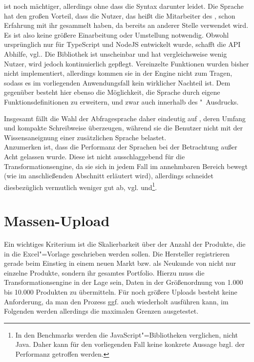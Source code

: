  ist noch mächtiger, allerdings ohne dass die Syntax darunter leidet. Die Sprache hat den großen Vorteil, dass die Nutzer, das heißt die Mitarbeiter des , schon Erfahrung mit ihr gesammelt haben, da  bereits an anderer Stelle verwendet wird. Es ist also keine größere Einarbeitung oder Umstellung notwendig. Obwohl  ursprünglich nur für TypeScript und NodeJS entwickelt wurde, schafft die API  Abhilfe, vgl.\nbs\cite{jsonata:java}. Die Bibliothek ist unscheinbar und hat vergleichsweise wenig Nutzer, wird jedoch kontinuierlich gepflegt. Vereinzelte Funktionen wurden bisher nicht implementiert, allerdings kommen sie in der Engine nicht zum Tragen, sodass es im vorliegenden Anwendungsfall kein wirklicher Nachteil ist. Dem gegenüber besteht hier ebenso die Möglichkeit, die Sprache durch eigene Funktionsdefinitionen zu erweitern, und zwar auch innerhalb des "~Ausdrucks.

Insgesamt fällt die Wahl der Abfragesprache daher eindeutig auf , deren Umfang und kompakte Schreibweise überzeugen, während sie die Benutzer nicht mit der Wissensaneignung einer zusätzlichen Sprache belastet.\\
Anzumerken ist, dass die Performanz der Sprachen bei der Betrachtung außer Acht gelassen wurde. Diese ist nicht ausschlaggebend für die Transformationsengine, da sie sich in jedem Fall im annehmbaren Bereich bewegt (wie im anschließenden Abschnitt erläutert wird), allerdings schneidet diesbezüglich  vermutlich weniger gut ab, vgl.\nbs\cite{eval:bm1} und\nbs\cite{eval:bm2}\footnote{In den Benchmarks werden die JavaScript"=Bibliotheken verglichen, nicht Java. Daher kann für den vorliegenden Fall keine konkrete Aussage bzgl. der Performanz getroffen werden.}. 
 

\section{Massen-Upload}\label{MUT}
Ein wichtiges Kriterium ist die Skalierbarkeit über der Anzahl der Produkte, die in die Excel"=Vorlage geschrieben werden sollen. Die Hersteller registrieren gerade beim Einstieg in einem neuen Markt bzw. als Neukunde von  nicht nur einzelne Produkte, sondern ihr gesamtes Portfolio. Hierzu muss die Transformationsengine in der Lage sein, Daten in der Größenordnung von 1.000 bis 10.000 Produkten zu übermitteln. Für noch größere Uploads besteht keine Anforderung, da man den Prozess ggf. auch wiederholt ausführen kann, im Folgenden werden allerdings die maximalen Grenzen ausgetestet.  

